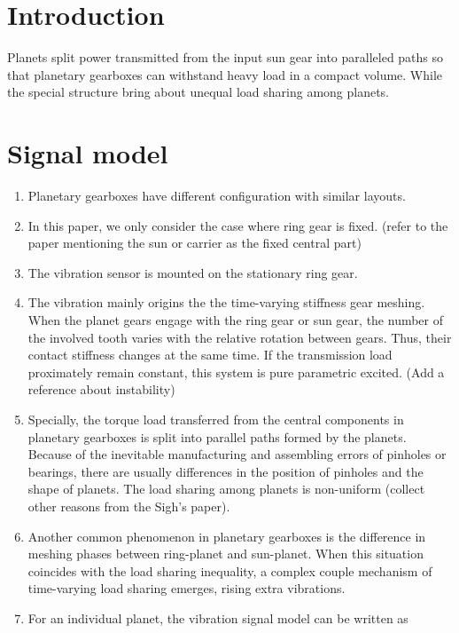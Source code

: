 \documentclass[a4paper,fleqn]{cas-sc}%
\begin{document}
\section{Introduction}
\par Planets split power transmitted from the input sun gear into paralleled paths so that planetary gearboxes can withstand heavy load in a compact volume. While the special structure bring about unequal load sharing among planets.
\section{Signal model}
\begin{enumerate}[1.]
    \item Planetary gearboxes have different configuration with similar layouts.
    \item In this paper, we only consider the case where ring gear is fixed. (refer to the paper mentioning the sun or carrier as the fixed central part)
    \item The vibration sensor is mounted on the stationary ring gear.
    \item The vibration mainly origins the the time-varying stiffness gear meshing. When the planet gears engage with the ring gear or sun gear, the number of the involved tooth varies with the relative rotation between gears. Thus, their contact stiffness changes at the same time. If the transmission load proximately remain constant, this system is pure parametric excited. (Add a reference about instability) 
    \item Specially, the torque load transferred from the central components in planetary gearboxes is split into parallel paths formed by the planets. Because of the inevitable manufacturing and assembling errors of pinholes or bearings, there are usually differences in the position of pinholes and the shape of planets. The load sharing among planets is non-uniform (collect other reasons from the Sigh's paper).
    \item Another common phenomenon in planetary gearboxes is the difference in meshing phases between ring-planet and sun-planet. When this situation coincides with the load sharing inequality, a complex couple mechanism of time-varying load sharing emerges, rising extra vibrations.
    \item For an individual planet, the vibration signal model can be written as
    

\end{enumerate}
\end{document}
